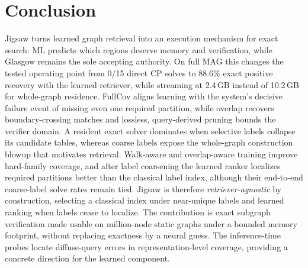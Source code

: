 \documentclass[runningheads]{llncs}
\begin{document}
\section{Conclusion}

Jigsaw turns learned graph retrieval into an execution mechanism for exact search: ML predicts which regions deserve memory and verification, while Glasgow remains the sole accepting authority. On full MAG this changes the tested operating point from 0/15 direct CP solves to 88.6\% exact positive recovery with the learned retriever, while streaming at 2.4\,GB instead of 10.2\,GB for whole-graph residence. FullCov aligns learning with the system's decisive failure event of missing even one required partition, while overlap recovers boundary-crossing matches and lossless, query-derived pruning bounds the verifier domain. A resident exact solver dominates when selective labels collapse its candidate tables, whereas coarse labels expose the whole-graph construction blowup that motivates retrieval. Walk-aware and overlap-aware training improve hard-family coverage, and after label coarsening the learned ranker localizes required partitions better than the classical label index, although their end-to-end coarse-label solve rates remain tied. Jigsaw is therefore \emph{retriever-agnostic} by construction, selecting a classical index under near-unique labels and learned ranking when labels cease to localize. The contribution is exact subgraph verification made usable on million-node static graphs under a bounded memory footprint, without replacing exactness by a neural guess. The inference-time probes locate diffuse-query errors in representation-level coverage, providing a concrete direction for the learned component.
\end{document}
